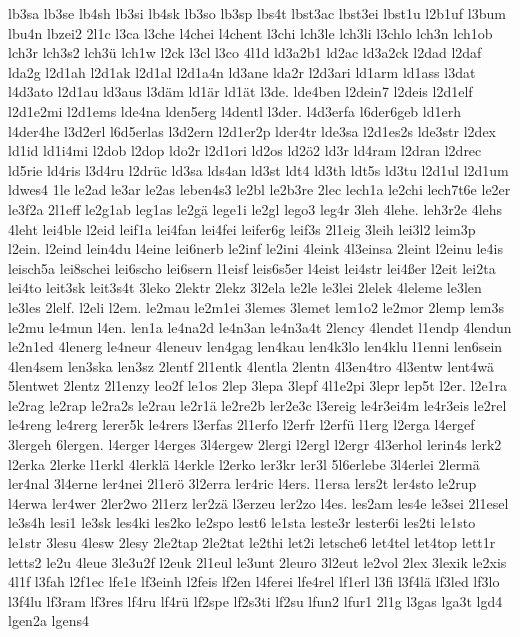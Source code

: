 {lb3sa
lb3se
lb4sh
lb3si
lb4sk
lb3so
lb3sp
lbs4t
lbst3ac
lbst3ei
lbst1u
l2b1uf
l3bum
lbu4n
lbzei2
2l1c
l3ca
l3che
l4chei
l4chent
l3chi
lch3le
lch3li
l3chlo
lch3n
lch1ob
lch3r
lch3s2
lch3ü
lch1w
l2ck
l3cl
l3co
4l1d
ld3a2b1
ld2ac
ld3a2ck
l2dad
l2daf
lda2g
l2d1ah
l2d1ak
l2d1al
l2d1a4n
ld3ane
lda2r
l2d3ari
ld1arm
ld1ass
l3dat
l4d3ato
l2d1au
ld3aus
l3däm
ld1är
ld1ät
l3de.
lde4ben
l2dein7
l2deis
l2d1elf
l2d1e2mi
l2d1ems
lde4na
lden5erg
l4dentl
l3der.
l4d3erfa
l6der6geb
ld1erh
l4der4he
l3d2erl
l6d5erlas
l3d2ern
l2d1er2p
lder4tr
lde3sa
l2d1es2s
lde3str
l2dex
ld1id
ld1i4mi
l2dob
l2dop
ldo2r
l2d1ori
ld2os
ld2ö2
ld3r
ld4ram
l2dran
l2drec
ld5rie
ld4ris
l3d4ru
l2drüc
ld3sa
lds4an
ld3st
ldt4
ld3th
ldt5s
ld3tu
l2d1ul
l2d1um
ldwes4
1le
le2ad
le3ar
le2as
leben4s3
le2bl
le2b3re
2lec
lech1a
le2chi
lech7t6e
le2er
le3f2a
2l1eff
le2g1ab
leg1as
le2gä
lege1i
le2gl
lego3
leg4r
3leh
4lehe.
leh3r2e
4lehs
4leht
lei4ble
l2eid
leif1a
lei4fan
lei4fei
leifer6g
leif3s
2l1eig
3leih
lei3l2
leim3p
l2ein.
l2eind
lein4du
l4eine
lei6nerb
le2inf
le2ini
4leink
4l3einsa
2leint
l2einu
le4is
leisch5a
lei8schei
lei6scho
lei6sern
l1eisf
leis6s5er
l4eist
lei4str
lei4ßer
l2eit
lei2ta
lei4to
leit3sk
leit3s4t
3leko
2lektr
2lekz
3l2ela
le2le
le3lei
2lelek
4leleme
le3len
le3les
2lelf.
l2eli
l2em.
le2mau
le2m1ei
3lemes
3lemet
lem1o2
le2mor
2lemp
lem3s
le2mu
le4mun
l4en.
len1a
le4na2d
le4n3an
le4n3a4t
2lency
4lendet
l1endp
4lendun
le2n1ed
4lenerg
le4neur
4leneuv
len4gag
len4kau
len4k3lo
len4klu
l1enni
len6sein
4len4sem
len3ska
len3sz
2lentf
2l1entk
4lentla
2lentn
4l3en4tro
4l3entw
lent4wä
5lentwet
2lentz
2l1enzy
leo2f
le1os
2lep
3lepa
3lepf
4l1e2pi
3lepr
lep5t
l2er.
l2e1ra
le2rag
le2rap
le2ra2s
le2rau
le2r1ä
le2re2b
ler2e3c
l3ereig
le4r3ei4m
le4r3eis
le2rel
le4reng
le4rerg
lerer5k
le4rers
l3erfas
2l1erfo
l2erfr
l2erfü
l1erg
l2erga
l4ergef
3lergeh
6lergen.
l4erger
l4erges
3l4ergew
2lergi
l2ergl
l2ergr
4l3erhol
lerin4s
lerk2
l2erka
2lerke
l1erkl
4lerklä
l4erkle
l2erko
ler3kr
ler3l
5l6erlebe
3l4erlei
2lermä
ler4nal
3l4erne
ler4nei
2l1erö
3l2erra
ler4ric
l4ers.
l1ersa
lers2t
ler4sto
le2rup
l4erwa
ler4wer
2ler2wo
2l1erz
ler2zä
l3erzeu
ler2zo
l4es.
les2am
les4e
le3sei
2l1esel
le3s4h
lesi1
le3sk
les4ki
les2ko
le2spo
lest6
le1sta
leste3r
lester6i
les2ti
le1sto
le1str
3lesu
4lesw
2lesy
2le2tap
2le2tat
le2thi
let2i
letsche6
let4tel
let4top
lett1r
letts2
le2u
4leue
3le3u2f
l2euk
2l1eul
le3unt
2leuro
3l2eut
le2vol
2lex
3lexik
le2xis
4l1f
l3fah
l2f1ec
lfe1e
lf3einh
l2feis
lf2en
l4ferei
lfe4rel
lf1erl
l3fi
l3f4lä
lf3led
lf3lo
l3f4lu
lf3ram
lf3res
lf4ru
lf4rü
lf2spe
lf2s3ti
lf2su
lfun2
lfur1
2l1g
l3gas
lga3t
lgd4
lgen2a
lgens4
}
